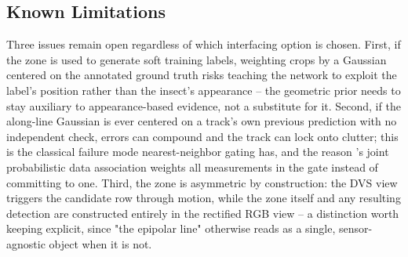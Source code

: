 \subsection{Known Limitations}
\label{sec:zone-limitations}

Three issues remain open regardless of which interfacing option is chosen.
First, if the zone is used to generate soft training labels, weighting
crops by a Gaussian centered on the annotated ground truth risks teaching
the network to exploit the label's position rather than the insect's
appearance -- the geometric prior needs to stay auxiliary to appearance-based
evidence, not a substitute for it. Second, if the along-line Gaussian is
ever centered on a track's own previous prediction with no independent
check, errors can compound and the track can lock onto clutter; this is the
classical failure mode nearest-neighbor gating has, and the reason
\textcite{fortmann_sonar_1983}'s joint probabilistic data association
weights all measurements in the gate instead of committing to one. Third,
the zone is asymmetric by construction: the DVS view triggers the candidate
row through motion, while the zone itself and any resulting detection are
constructed entirely in the rectified RGB view -- a distinction worth
keeping explicit, since "the epipolar line" otherwise reads as a single,
sensor-agnostic object when it is not.
